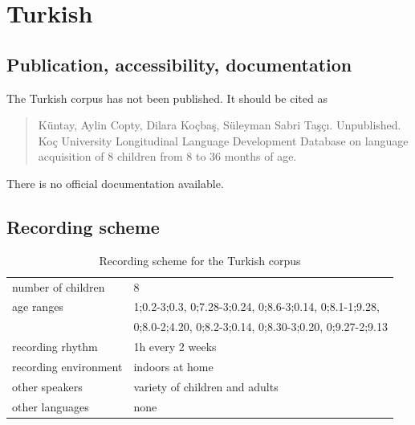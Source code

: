 \documentclass[a4paper, 11pt]{book}
\begin{document}


\section{Turkish}
\label{sec:Turkish}

\subsection{Publication, accessibility, documentation}

The Turkish corpus \citep{Kuntay2015a} has not been published. It should be cited as 

\begin{quote}
	Küntay, Aylin Copty, Dilara Koçbaş, Süleyman Sabri Taşçı. Unpublished. Koç University Longitudinal Language Development Database on language acquisition of 8 children from 8 to 36 months of age. 
\end{quote}

\noindent There is no official documentation available. 

\subsection{Recording scheme}

\begin{table}[ht]
	\centering
	\begin{tabular}{ll}
		\toprule
		number of children 	& 8 \\
		age ranges 			& 1;0.2-3;0.3, 0;7.28-3;0.24, 0;8.6-3;0.14, 0;8.1-1;9.28, \\
							& 0;8.0-2;4.20, 0;8.2-3;0.14, 0;8.30-3;0.20, 0;9.27-2;9.13 \\
		recording rhythm 	& 1h every 2 weeks \\
		recording environment & indoors at home \\
		other speakers 		& variety of children and adults \\
		other languages		& none \\
		\bottomrule
	\end{tabular}
	\caption{Recording scheme for the Turkish corpus}
	\label{tab:Turkish recording scheme}
\end{table}
\end{document}
